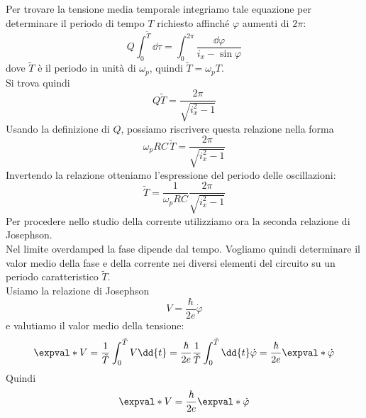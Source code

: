Per trovare la tensione media temporale integriamo tale equazione per determinare il periodo di tempo $T$ richiesto affinché $\varphi$ aumenti di $2\pi$:
\begin{equation*}
    Q \int_{0}^{\tilde{T}} \dd{\tau} = \int_{0}^{2\pi} \frac{\dd{\varphi}}{i_x-\sin{\varphi}}
\end{equation*}
dove $\tilde{T}$ è il periodo in unità di $\omega_p$, quindi $\tilde{T}=\omega_p T$.\\
Si trova quindi
\begin{equation*}
    Q\tilde{T} = \frac{2\pi}{\sqrt{i_x^2-1}}
\end{equation*}
Usando la definizione di $Q$, possiamo riscrivere questa relazione nella forma
\begin{equation*}
    \omega_p RC\,\tilde{T}
    =
    \frac{2\pi}{\sqrt{i_x^2-1}}
\end{equation*}
Invertendo la relazione otteniamo l'espressione del periodo delle oscillazioni:
\begin{equation}
    \tilde{T}
    =
    \frac{1}{\omega_p RC}
    \frac{2\pi}{\sqrt{i_x^2-1}}
    \label{eq:period_oscillations_RCSJ}
\end{equation}
Per procedere nello studio della corrente utilizziamo ora la seconda relazione di Josephson.\\
Nel limite overdamped la fase dipende dal tempo. Vogliamo quindi determinare il valor medio della fase e della corrente nei diversi elementi del circuito su un periodo caratteristico $\tilde{T}$.\\
Usiamo la relazione di Josephson
\begin{equation*}
    V
    =
    \frac{\hbar}{2e}
    \dot{\varphi}
\end{equation*}
e valutiamo il valor medio della tensione:
\begin{equation*}
    \expval*{V}
    = \frac{1}{\tilde{T}} \int_{0}^{\tilde{T}} V \dd{t}
    = \frac{\hbar}{2e} \frac{1}{\tilde{T}} \int_{0}^{\tilde{T}} \dd{t} \dot{\varphi}
    = \frac{\hbar}{2e} \expval*{\dot{\varphi}}
\end{equation*}
Quindi
\begin{equation*}
    \expval*{V} = \frac{\hbar}{2e} \expval*{\dot{\varphi}}
\end{equation*}
